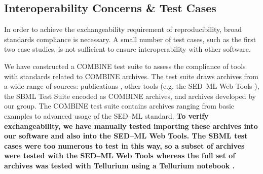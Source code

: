 \documentclass[10pt,letterpaper]{article}
\begin{document}


\subsection*{Interoperability Concerns \& Test Cases}

In order to achieve the exchangeability requirement of reproducibility, broad standards compliance is necessary. A small number of test cases, such as the first two case studies, is not sufficient to ensure interoperability with other software.

We have constructed a COMBINE test suite to assess the compliance of tools with standards related to COMBINE archives. The test suite draws archives from a wide range of sources: publications \cite{bergmann2014combine,scharmf1000}, other tools (e.g. the SED--ML Web Tools \cite{bergmann2017sed}), the SBML Test Suite encoded as COMBINE archives, and archives developed by our group. The COMBINE test suite contains archives ranging from basic examples to advanced usage of the SED--ML standard. \textbf{To verify exchangeability, we have manually tested importing these archives into our software and also into the SED--ML Web Tools. The SBML test cases were too numerous to test in this way, so a subset of archives were tested with the SED--ML Web Tools whereas the full set of archives was tested with Tellurium using a Tellurium notebook \cite{sbmltsnotebook}.}
\end{document}
